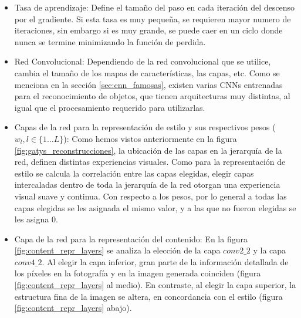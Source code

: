 \documentclass[a4paper,11pt,spanish]{book}
\begin{document}
\begin{itemize}
	 \item Tasa de aprendizaje: Define el tamaño del paso en cada iteración del descenso por el gradiente. Si esta tasa es muy pequeña, se requieren mayor numero 
	  de iteraciones, sin embargo si es muy grande, se puede caer en un ciclo donde nunca se termine minimizando la función de perdida. 
	 \item Red Convolucional: Dependiendo de la red convolucional que se utilice, cambia el tamaño de los mapas de características, las capas, etc.
	  Como se menciona en la sección \ref{sec:cnn_famosas}, existen varias CNNs entrenadas para el reconocimiento de objetos, que tienen arquitecturas
	  muy distintas, al igual que el procesamiento requerido para utilizarlas.
	 \item Capas de la red para la representación de estilo y sus respectivos pesos ($w_l, l \in \{1 \dots L\}$): Como hemos vistos anteriormente en la figura \ref{fig:gatys_reconstrucciones}, 
	 la ubicación de las capas en la jerarquía de la red, definen distintas experiencias visuales. Como para la representación de estilo se calcula la correlación entre las capas elegidas,
	 elegir capas intercaladas dentro de toda la jerarquía de la red otorgan una experiencia visual suave y continua.
	 Con respecto a los pesos, por lo general a todas las capas elegidas se les asignada el mismo valor, y a las que no fueron elegidas se les asigna 0.
	 \item Capa de la red para la representación del contenido: En la figura \ref{fig:content_repr_layers} se analiza la elección de la capa $conv2\_2$ y la capa $conv4\_2$.
	 Al elegir la capa inferior, gran parte de la información detallada de los píxeles en la fotografía y en la imagen generada coinciden (figura \ref{fig:content_repr_layers} al medio).
	 En contraste, al elegir la capa superior, la estructura fina de la imagen se altera, en concordancia con el estilo (figura \ref{fig:content_repr_layers} abajo).
	 \begin{figure}[h]

\end{figure}
\end{itemize}
\end{document}
